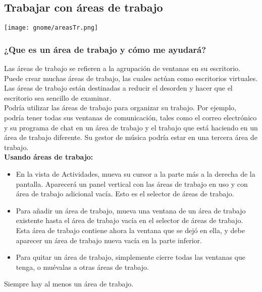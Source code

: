 \subsection{Trabajar con áreas de trabajo}
\begin{center}
\texttt{[image: gnome/areasTr.png]} 
\end{center}
\subsubsection{¿Que es un área de trabajo y cómo me ayudará?}
Las áreas de trabajo se refieren a la agrupación de ventanas en su escritorio. Puede crear muchas áreas de trabajo, las cuales actúan como escritorios virtuales. Las áreas de trabajo están destinadas a reducir el desorden y hacer que el escritorio sea sencillo de examinar.\\

Podría utilizar las áreas de trabajo para organizar su trabajo. Por ejemplo, podría tener todas sus ventanas de comunicación, tales como el correo electrónico y su programa de chat en un área de trabajo y el trabajo que está haciendo en un área de trabajo diferente. Su gestor de música podría estar en una tercera área de trabajo.\\

{\bf Usando áreas de trabajo:}
\begin{itemize}
\item En la vista de Actividades, mueva su cursor a la parte más a la derecha de la pantalla. Aparecerá un panel vertical con las áreas de trabajo en uso y con área de trabajo adicional vacía. Esto es el selector de áreas de trabajo.
\item Para añadir un área de trabajo, mueva una ventana de un área de trabajo existente hasta el área de trabajo vacía en el selector de áreas de trabajo. Esta área de trabajo contiene ahora la ventana que se dejó en ella, y debe aparecer un área de trabajo nueva vacía en la parte inferior.
\item Para quitar un área de trabajo, simplemente cierre todas las ventanas que tenga, o muévalas a otras áreas de trabajo.
\end{itemize}
Siempre hay al menos un área de trabajo.
